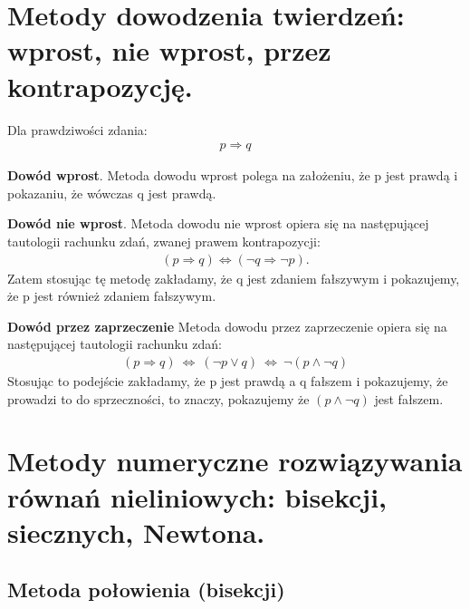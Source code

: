 \documentclass[12pt]{article}
\begin{document}
    \newpage

    \section{Metody dowodzenia twierdzeń: wprost, nie wprost, przez kontrapozycję.}

    Dla prawdziwości zdania:
    \begin{align*}
        p \Rightarrow q
    \end{align*}

    \begin{definition}
        \textbf{Dowód wprost}. Metoda dowodu wprost polega na założeniu, że p jest prawdą i pokazaniu, że wówczas q
        jest prawdą.
    \end{definition}

    \begin{definition}
        \textbf{Dowód nie wprost}. Metoda dowodu nie wprost opiera się na następującej tautologii rachunku
        zdań, zwanej prawem kontrapozycji:
        \begin{align*}
            (p \Rightarrow q) \Leftrightarrow (\neg q \Rightarrow \neg p).
        \end{align*}
        Zatem stosując tę metodę zakładamy, że q jest zdaniem fałszywym i pokazujemy, że p jest również
        zdaniem fałszywym.
    \end{definition}

    \begin{definition}
        \textbf{Dowód przez zaprzeczenie} Metoda dowodu przez zaprzeczenie opiera się na następującej tautologii rachunku
        zdań:
        \begin{align*}
            (p \Rightarrow q) ~ \Leftrightarrow ~ (\neg p \vee q) ~ \Leftrightarrow ~ \neg(p \wedge \neg q)
        \end{align*}
        Stosując to podejście zakładamy, że p jest prawdą a q fałszem i pokazujemy, że prowadzi to do sprzeczności,
        to znaczy, pokazujemy że $(p \wedge \neg q)$ jest fałszem.
    \end{definition}

    \newpage

    \section{Metody numeryczne rozwiązywania równań nieliniowych: bisekcji, siecznych, Newtona.}

    \subsection{Metoda połowienia (bisekcji)}
\end{document}
